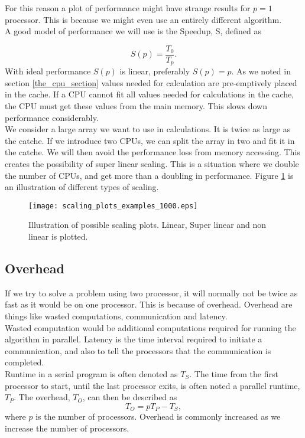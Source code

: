 \documentclass[a4paper,norsk,11pt,twoside]{report}
\begin{document}
For this reason a plot of performance might have strange results for
$p= 1$ processor. This is because we might even use an entirely
different algorithm. \\

A good model of performance we will use is the Speedup, S, defined as

\begin{equation}
S(p) = \frac{T_0}{T_p} .
\end{equation}
With ideal performance $S(p)$ is linear, preferably $S(p) = p$. As we
noted in section \ref{the_cpu_section} values needed for calculation
are pre-emptively placed in the cache. If a CPU cannot fit all values
needed for calculations in the cache, the CPU must get these values
from the main memory. This slows down performance considerably. \\

We consider a large array we want to use in calculations. It is twice
as large as the catche. If we introduce two CPUs, we can split the
array in two and fit it in the catche. We will then avoid the
performance loss from memory accessing. This creates the possibility
of super linear scaling. This is a situation where we double the
number of CPUs, and get more than a doubling in performance. Figure
\ref{super_linear_scaling} is an illustration of different types of
scaling.

\begin{figure}[ht!]
\centering
\texttt{[image: scaling\_plots\_examples\_1000.eps]}
\caption{Illustration of possible scaling plots. Linear, Super linear and non linear is plotted.}
\label{super_linear_scaling}
\end{figure}

\subsection{Overhead}
If we try to solve a problem using two processor, it will normally not be twice as fast as it would be on one processor. This is because of overhead. Overhead are things like wasted computations, communication and latency. \\

Wasted computation would be additional computations required for
running the algorithm in parallel. Latency is the time interval
required to initiate a communication, and also to tell the processors
that the communication is completed. \\

Runtime in a serial program is often denoted as $T_S$. The time from
the first processor to start, until the last processor exits, is often
noted a parallel runtime, $T_P$. The overhead, $T_O$, can then be
described as
\begin{equation}
T_O = p T_P - T_S ,
\end{equation}
where $p$ is the number of processors. Overhead is commonly increased as we increase the number of processors.
\end{document}
